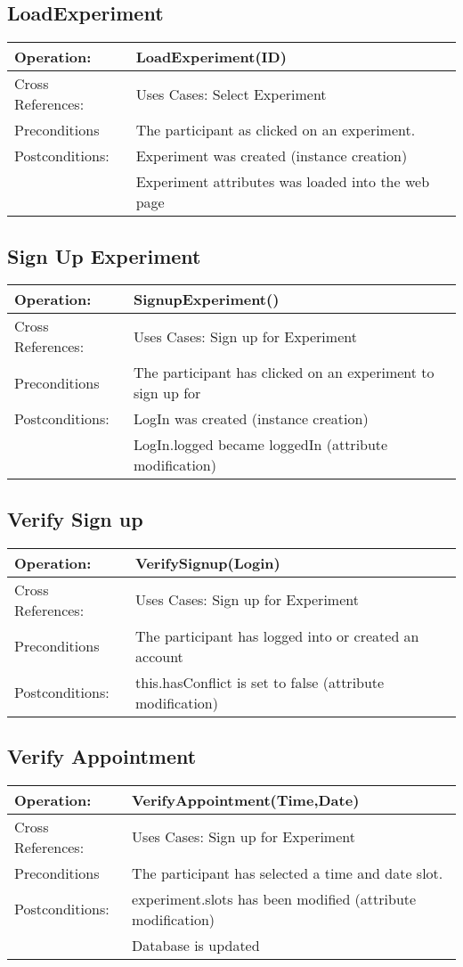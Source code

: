 \subsection{LoadExperiment}
\begin{tabular}{|l|l|}
\hline Operation: & LoadExperiment(ID) \\ 
\hline Cross References: & Uses Cases: Select Experiment \\ 
\hline Preconditions & The participant as clicked on an experiment. \\ 
\hline Postconditions: & Experiment was created (instance creation) \\
\hline & Experiment attributes was loaded into the web page \\
\hline 
\end{tabular}

\subsection{Sign Up Experiment}
\begin{tabular}{|l|l|}
\hline Operation: & SignupExperiment() \\ 
\hline Cross References: & Uses Cases: Sign up for Experiment \\ 
\hline Preconditions & The participant has clicked on an experiment to sign up for \\ 
\hline Postconditions: & LogIn was created (instance creation) \\
\hline & LogIn.logged became loggedIn (attribute modification) \\
\hline 
\end{tabular}

\subsection{Verify Sign up}
\begin{tabular}{|l|l|}
\hline Operation: & VerifySignup(Login) \\ 
\hline Cross References: & Uses Cases: Sign up for Experiment \\ 
\hline Preconditions & The participant has logged into or created an account \\ 
\hline Postconditions: & this.hasConflict is set to false (attribute modification) \\
\hline 
\end{tabular}

\subsection{Verify Appointment}
\begin{tabular}{|l|l|}
\hline Operation: & VerifyAppointment(Time,Date) \\ 
\hline Cross References: & Uses Cases: Sign up for Experiment \\ 
\hline Preconditions & The participant has selected a time and date slot. \\ 
\hline Postconditions: & experiment.slots has been modified (attribute modification) \\
\hline & Database is updated \\
\hline 
\end{tabular}
